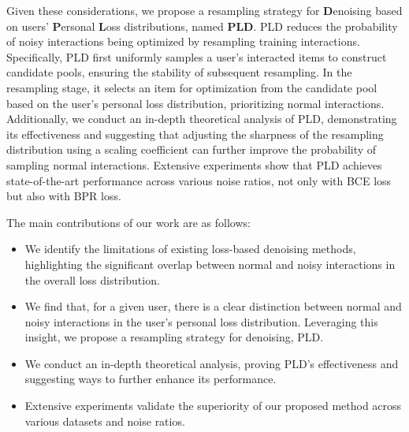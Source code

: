 Given these considerations, we propose a resampling strategy for \textbf{D}enoising based on users' \textbf{P}ersonal \textbf{L}oss distributions, named \textbf{PLD}. PLD reduces the probability of noisy interactions being optimized by resampling training interactions. Specifically, PLD first uniformly samples a user's interacted items to construct candidate pools,  ensuring the stability of subsequent resampling. In the resampling stage, it selects an item for optimization from the candidate pool based on the user's personal loss distribution, prioritizing normal interactions. Additionally, we conduct an in-depth theoretical analysis of PLD, demonstrating its effectiveness and suggesting that adjusting the sharpness of the resampling distribution using a scaling coefficient can further improve the probability of sampling normal interactions. Extensive experiments show that PLD achieves state-of-the-art performance across various noise ratios, not only with BCE loss but also with BPR loss.

The main contributions of our work are as follows:

\begin{itemize}[leftmargin=*]
    \item We identify the limitations of existing loss-based denoising methods, highlighting the significant overlap between normal and noisy  interactions in the overall loss distribution.
    \item We find that, for a given user, there is a clear distinction between normal and noisy interactions in the user's personal loss distribution. Leveraging this insight, we propose a resampling strategy for denoising, PLD.
    \item We conduct an in-depth theoretical analysis, proving PLD's effectiveness and suggesting ways to further enhance its performance.
    \item Extensive experiments validate the superiority of our proposed method across various datasets and noise ratios.
\end{itemize}

